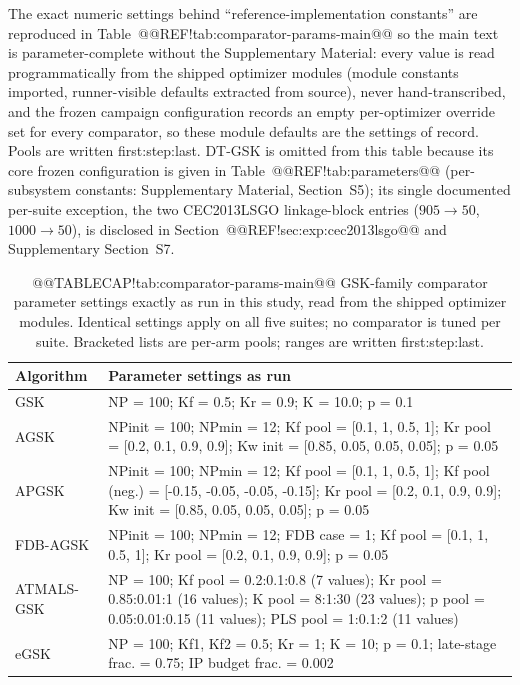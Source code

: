 \documentclass[10pt,a4paper]{article}
\newcommand{\dtgsk}{DT-GSK}
\begin{document}
The exact numeric settings behind ``reference-implementation constants'' are reproduced
in Table~@@REF!tab:comparator-params-main@@ so the main text is
parameter-complete without the Supplementary Material: every value is
read programmatically from the shipped optimizer modules (module
constants imported, runner-visible defaults extracted from source),
never hand-transcribed, and the frozen campaign configuration records an
empty per-optimizer override set for every comparator, so these module
defaults are the settings of record. Pools are written first:step:last.
\dtgsk{} is omitted from this table because its core frozen
configuration is given in Table~@@REF!tab:parameters@@ (per-subsystem
constants: Supplementary Material, Section~S5); its single
documented per-suite exception, the two CEC2013LSGO linkage-block
entries ($905 \to 50$, $1000 \to 50$), is disclosed in
Section~@@REF!sec:exp:cec2013lsgo@@ and Supplementary Section~S7.



\begin{table}[H]
\caption{@@TABLECAP!tab:comparator-params-main@@ GSK-family comparator parameter settings exactly as run in this
study, read from the shipped optimizer modules. Identical settings apply
on all five suites; no comparator is tuned per suite. Bracketed lists are
per-arm pools; ranges are written first:step:last.}\label{tab:comparator-params-main}


\begin{tabular}{@{}l p{11.4cm}@{}}
\toprule
\textbf{Algorithm} & \textbf{Parameter settings as run} \\
\midrule
GSK & NP = 100; Kf = 0.5; Kr = 0.9; K = 10.0; p = 0.1 \\
AGSK & NPinit = 100; NPmin = 12; Kf pool = [0.1, 1, 0.5, 1]; Kr pool = [0.2, 0.1, 0.9, 0.9]; Kw init = [0.85, 0.05, 0.05, 0.05]; p = 0.05 \\
APGSK & NPinit = 100; NPmin = 12; Kf pool = [0.1, 1, 0.5, 1]; Kf pool (neg.) = [-0.15, -0.05, -0.05, -0.15]; Kr pool = [0.2, 0.1, 0.9, 0.9]; Kw init = [0.85, 0.05, 0.05, 0.05]; p = 0.05 \\
FDB-AGSK & NPinit = 100; NPmin = 12; FDB case = 1; Kf pool = [0.1, 1, 0.5, 1]; Kr pool = [0.2, 0.1, 0.9, 0.9]; p = 0.05 \\
ATMALS-GSK & NP = 100; Kf pool = 0.2:0.1:0.8 (7 values); Kr pool = 0.85:0.01:1 (16 values); K pool = 8:1:30 (23 values); p pool = 0.05:0.01:0.15 (11 values); PLS pool = 1:0.1:2 (11 values) \\
eGSK & NP = 100; Kf1, Kf2 = 0.5; Kr = 1; K = 10; p = 0.1; late-stage frac. = 0.75; IP budget frac. = 0.002 \\
\bottomrule
\end{tabular}



\end{table}
\end{document}
